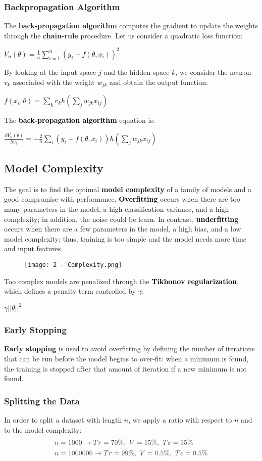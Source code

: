 \documentclass{article}
\newcommand{\bb}[1]{\textcolor{black}{\textbf{#1}}}
\newcommand{\rr}[1]{\textcolor{black}{#1}}
\newcommand{\cc}[1]{\begin{center}\textcolor{black}{#1}\end{center}}
\begin{document}
\subsubsection{Backpropagation Algorithm}
The \textbf{back-propagation algorithm} computes the gradient to update the weights through the \textbf{chain-rule} procedure. Let us consider a quadratic loss function:
\cc{$V_n(\theta) = \displaystyle\frac{1}{n} \displaystyle\sum^n_{i = 1} (y_i - f(\theta, x_i))^2$}
By looking at the input space \rr{$j$} and the hidden space \rr{$k$}, we consider the neuron \rr{$v_k$} associated with the weight \rr{$w_{jk}$} and obtain the output function:
\cc{$f(x_i,\theta) = \displaystyle\sum_k v_kh(\displaystyle\sum_jw_{jk}x_{ij})$}
The \bb{back-propagation algorithm} equation is:
\cc{$\displaystyle\frac{\partial V_n(\theta)}{\partial v_k}=-\displaystyle\frac{2}{n}\displaystyle\sum_i(y_i-f(\theta, x_i))h(\displaystyle\sum_jw_{jk}x_{ij})$}

\subsection{Model Complexity}
The goal is to find the optimal \bb{model complexity} of a family of models and a good compromise with performance. \bb{Overfitting} occurs when there are too many parameters in the model, a high classification variance, and a high complexity; in addition, the noise could be learn. In contrast, \bb{underfitting} occurs when there are a few parameters in the model, a high bias, and a low model complexity; thus, training is too simple and the model needs more time and input features.
\begin{figure}[H]
    \centering
    \texttt{[image: 2 - Complexity.png]}
\end{figure}
\noindent
Too complex models are penalized through the \bb{Tikhonov regularization}, which defines a penalty term controlled by \rr{$\gamma$}:
\cc{$\gamma||\theta||^2$}
\subsubsection{Early Stopping}
\bb{Early stopping} is used to avoid overfitting by defining the number of iterations that can be run before the model begins to over-fit: when a minimum is found, the training is stopped after that amount of iteration if a new minimum is not found.
\subsubsection{Splitting the Data}
In order to split a dataset with length \rr{$n$}, we apply a ratio with respect to \rr{$n$} and to the model complexity:
\begin{align*}
    &\textcolor{darkgray}{n = 1000 \rightarrow Tr = 70\%, \ V = 15\%, \ Te=15\%} \\
    &\textcolor{darkgray}{n = 1000000 \rightarrow Tr = 99\%, \ V = 0.5\%, \ Te=0.5\%}
\end{align*}
\end{document}
